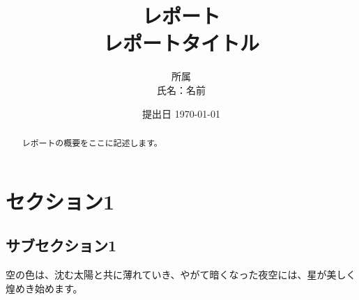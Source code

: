 \documentclass[autodetect-engine,dvipdfmx,ja=standard,a4paper,12pt]{bxjsarticle}
\begin{document}
\title{レポート \\
  レポートタイトル
}
\date{提出日 \today}
\author{所属 \\
  氏名：名前}

\maketitle
\begin{abstract}
  レポートの概要をここに記述します。
\end{abstract}

\newpage


\section{セクション1}
\subsection{サブセクション1}

空の色は、沈む太陽と共に薄れていき、やがて暗くなった夜空には、星が美しく煌めき始めます。

% 
% 
\end{document}
